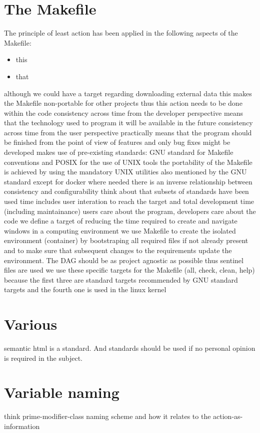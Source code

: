 \documentclass[journal]{IEEEtran}
\begin{document}
\section{The Makefile}
The principle of least action has been applied in the following aspects of the Makefile:
\begin{itemize}
	\item this
	\item that
\end{itemize}

although we could have a target regarding downloading external data this makes the Makefile non-portable for other projects thus this action needs to be done within the code
consistency across time from the developer perspective means that the technology used to program it will be available in the future
consistency across time from the user perspective practically means that the program should be finished from the point of view of features and only bug fixes might be developed
makes use of pre-existing standards: GNU standard for Makefile conventions and POSIX for the use of UNIX tools
the portability of the Makefile is achieved by using the mandatory UNIX utilities also mentioned by the GNU standard except for docker where needed
there is an inverse relationship between consistency and configurability
think about that subsets of standards have been used
time includes user interation to reach the target and total development time (including maintainance)
users care about the program, developers care about the code
we define a target of reducing the time required to create and navigate windows in a computing environment
we use Makefile to create the isolated environment (container) by bootstraping all required files if not already present and to make sure that subsequent changes to the requirements update the environment. The DAG should be as project agnostic as possible thus sentinel files are used
we use these specific targets for the Makefile (all, check, clean, help) because the first three are standard targets recommended by GNU standard targets and the fourth one is used in the linux kernel

\section{Various}
semantic html is a standard. And standards should be used if no personal opinion is required in the subject.

\section{Variable naming}
think prime-modifier-class naming scheme and how it relates to the action-as-information
\end{document}
